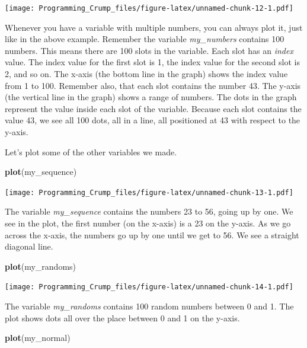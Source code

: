 \documentclass[]{book}
\newenvironment{Shaded}{\begin{snugshade}}{\end{snugshade}}
\newcommand{\KeywordTok}[1]{\textcolor[rgb]{0.13,0.29,0.53}{\textbf{{#1}}}}
\newcommand{\NormalTok}[1]{{#1}}
\theoremstyle{definition}
\theoremstyle{definition}
\theoremstyle{definition}
\theoremstyle{remark}
\begin{document}
\texttt{[image: Programming\_Crump\_files/figure-latex/unnamed-chunk-12-1.pdf]}

Whenever you have a variable with multiple numbers, you can always plot
it, just like in the above example. Remember the variable
\emph{my\_numbers} contains 100 numbers. This means there are 100 slots
in the variable. Each slot has an \emph{index} value. The index value
for the first slot is 1, the index value for the second slot is 2, and
so on. The x-axis (the bottom line in the graph) shows the index value
from 1 to 100. Remember also, that each slot contains the number 43. The
y-axis (the vertical line in the graph) shows a range of numbers. The
dots in the graph represent the value inside each slot of the variable.
Because each slot contains the value 43, we see all 100 dots, all in a
line, all positioned at 43 with respect to the y-axis.

Let's plot some of the other variables we made.

\begin{Shaded}
\begin{Highlighting}[]
\KeywordTok{plot}\NormalTok{(my_sequence)}
\end{Highlighting}
\end{Shaded}

\texttt{[image: Programming\_Crump\_files/figure-latex/unnamed-chunk-13-1.pdf]}

The variable \emph{my\_sequence} contains the numbers 23 to 56, going up
by one. We see in the plot, the first number (on the x-axis) is a 23 on
the y-axis. As we go across the x-axis, the numbers go up by one until
we get to 56. We see a straight diagonal line.

\begin{Shaded}
\begin{Highlighting}[]
\KeywordTok{plot}\NormalTok{(my_randoms)}
\end{Highlighting}
\end{Shaded}

\texttt{[image: Programming\_Crump\_files/figure-latex/unnamed-chunk-14-1.pdf]}

The variable \emph{my\_randoms} contains 100 random numbers between 0
and 1. The plot shows dots all over the place between 0 and 1 on the
y-axis.

\begin{Shaded}
\begin{Highlighting}[]
\KeywordTok{plot}\NormalTok{(my_normal)}
\end{Highlighting}
\end{Shaded}
\end{document}
